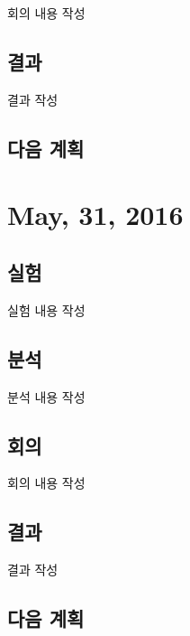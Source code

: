 \documentclass{research-note-v1.0}
\begin{document}
회의 내용 작성

\subsection*{결과}

결과 작성


\subsection*{다음 계획}




\section*{May, 31, 2016}

\subsection*{실험}

실험 내용 작성

\subsection*{분석}

분석 내용 작성

\subsection*{회의}

회의 내용 작성

\subsection*{결과}

결과 작성


\subsection*{다음 계획}
\end{document}
